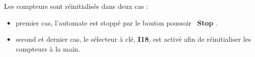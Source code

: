 Les compteurs sont réinitialisés dans deux cas :

\begin{itemize}
    
    \item premier cas, l'automate est stoppé par le bouton poussoir \guillemotleft \ \textbf{Stop} \guillemotright.
    
    \item second et dernier cas, le sélecteur à clé, \textbf{I18}, est activé afin de réinitialiser les compteurs à la main.
    
\end{itemize}
